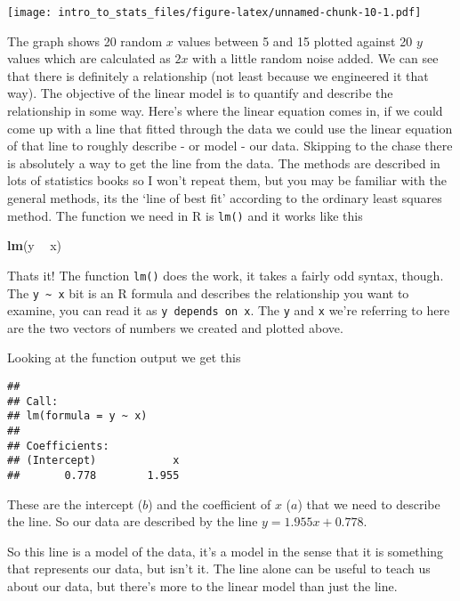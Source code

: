 \documentclass[]{book}
\newenvironment{Shaded}{\begin{snugshade}}{\end{snugshade}}
\newcommand{\KeywordTok}[1]{\textcolor[rgb]{0.13,0.29,0.53}{\textbf{#1}}}
\newcommand{\NormalTok}[1]{#1}
\newcommand{\OperatorTok}[1]{\textcolor[rgb]{0.81,0.36,0.00}{\textbf{#1}}}
\newcommand{\StringTok}[1]{\textcolor[rgb]{0.31,0.60,0.02}{#1}}
\begin{document}
\texttt{[image: intro\_to\_stats\_files/figure-latex/unnamed-chunk-10-1.pdf]}

The graph shows 20 random \(x\) values between 5 and 15 plotted against 20 \(y\) values which are calculated as \(2x\) with a little random noise added. We can see that there is definitely a relationship (not least because we engineered it that way). The objective of the linear model is to quantify and describe the relationship in some way. Here's where the linear equation comes in, if we could come up with a line that fitted through the data we could use the linear equation of that line to roughly describe - or model - our data. Skipping to the chase there is absolutely a way to get the line from the data. The methods are described in lots of statistics books so I won't repeat them, but you may be familiar with the general methods, its the `line of best fit' according to the ordinary least squares method. The function we need in R is \texttt{lm()} and it works like this

\begin{Shaded}
\begin{Highlighting}[]
\KeywordTok{lm}\NormalTok{(y }\OperatorTok{~}\StringTok{ }\NormalTok{x)}
\end{Highlighting}
\end{Shaded}

Thats it! The function \texttt{lm()} does the work, it takes a fairly odd syntax, though. The \texttt{y\ \textasciitilde{}\ x} bit is an R formula and describes the relationship you want to examine, you can read it as \texttt{y\ depends\ on\ x}. The \texttt{y} and \texttt{x} we're referring to here are the two vectors of numbers we created and plotted above.

Looking at the function output we get this

\begin{verbatim}
## 
## Call:
## lm(formula = y ~ x)
## 
## Coefficients:
## (Intercept)            x  
##       0.778        1.955
\end{verbatim}

These are the intercept (\(b\)) and the coefficient of \(x\) (\(a\)) that we need to describe the line. So our data are described by the line \(y = 1.955x + 0.778\).

So this line is a model of the data, it's a model in the sense that it is something that represents our data, but isn't it. The line alone can be useful to teach us about our data, but there's more to the linear model than just the line.
\end{document}
